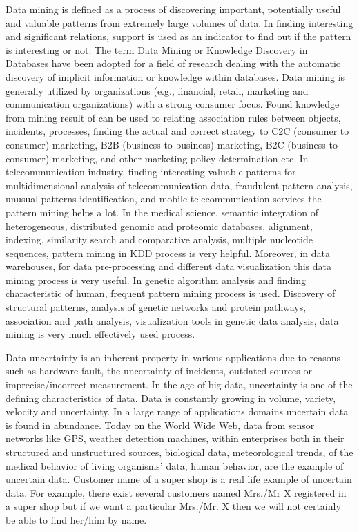 \documentclass[conference]{IEEEtran}
\begin{document}
Data mining is defined as a process of discovering important, potentially useful and valuable patterns from extremely large volumes of data. In finding interesting and significant relations, support is used as an indicator to find out if the pattern is interesting or not. The term Data Mining or Knowledge Discovery in Databases have been adopted for a field of research dealing with the automatic discovery of implicit information or knowledge within databases. Data mining is generally utilized by organizations (e.g., financial, retail, marketing and communication organizations) with a strong consumer focus. Found knowledge from mining result of can be used to relating association rules between objects, incidents, processes, finding the actual and correct strategy to C2C (consumer to consumer) marketing, B2B (business to business) marketing, B2C (business to consumer) marketing, and other marketing policy determination etc. In telecommunication industry, finding interesting valuable patterns for multidimensional analysis of telecommunication data, fraudulent pattern analysis, unusual patterns identification, and mobile telecommunication services the pattern mining helps a lot. In the medical science, semantic integration of heterogeneous, distributed genomic and proteomic databases, alignment, indexing, similarity search and comparative analysis, multiple nucleotide sequences, pattern mining in KDD process is very helpful. Moreover, in data warehouses, for data pre-processing and different data visualization this data mining process is very useful. In genetic algorithm analysis and finding characteristic of human, frequent pattern mining process is used. Discovery of structural patterns, analysis of genetic networks and protein pathways, association and path analysis, visualization tools in genetic data analysis, data mining is very much effectively used process.

Data uncertainty is an inherent property in various applications due to reasons such as hardware fault, the uncertainty of incidents, outdated sources or imprecise/incorrect measurement. In the age of big data, uncertainty is one of the defining characteristics of data. Data is constantly growing in volume, variety, velocity and uncertainty. In a large range of applications domains uncertain data is found in abundance. Today on the World Wide Web, data from sensor networks like GPS, weather detection machines, within enterprises both in their structured and unstructured sources, biological data, meteorological trends, of the medical behavior of living organisms’ data, human behavior, are the example of uncertain data. Customer name of a super shop is a real life example of uncertain data. For example, there exist several customers named Mrs./Mr X registered in a super shop but if we want a particular Mrs./Mr. X then we will not certainly be able to find her/him by name.
\end{document}
